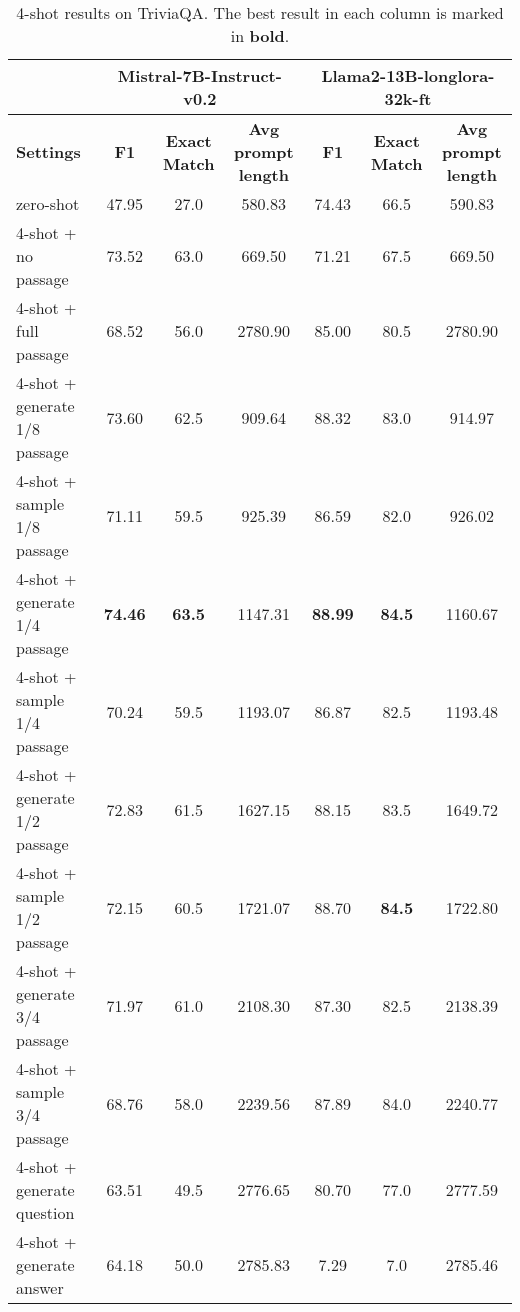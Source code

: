 \begin{table*}[tp]
\renewcommand\arraystretch{1.1}
\centering
\small
\begin{tabular}{l|ccc|ccc}
\bottomrule
\multicolumn{1}{l}{} & \multicolumn{3}{c}{\textbf{Mistral-7B-Instruct-v0.2}} & \multicolumn{3}{c}{\textbf{Llama2-13B-longlora-32k-ft}}\\
\hline
 \textbf{Settings} & \textbf{F1} & \textbf{Exact Match} & \textbf{Avg prompt length} & \textbf{F1} & \textbf{Exact Match} & \textbf{Avg prompt length}\\
\hline
zero-shot & 47.95 & 27.0 & 580.83 & 74.43 & 66.5 &590.83\\
4-shot + no passage & 73.52 & 63.0 & 669.50 & 71.21 & 67.5 & 669.50\\
4-shot + full passage & 68.52 & 56.0 & 2780.90 & 85.00 & 80.5 & 2780.90\\
\hline
4-shot + generate 1/8 passage & 73.60 & 62.5 & 909.64 & 88.32 & 83.0 & 914.97\\
4-shot + sample 1/8 passage & 71.11 & 59.5 & 925.39 & 86.59 & 82.0 & 926.02\\
4-shot + generate 1/4 passage & \textbf{74.46} & \textbf{63.5} & 1147.31 & \textbf{88.99} & \textbf{84.5} & 1160.67\\
4-shot + sample 1/4 passage & 70.24 & 59.5 & 1193.07 & 86.87 & 82.5 & 1193.48\\
4-shot + generate 1/2 passage & 72.83 & 61.5 & 1627.15 & 88.15 & 83.5 & 1649.72\\
4-shot + sample 1/2 passage & 72.15 & 60.5 & 1721.07 & 88.70 & \textbf{84.5} & 1722.80\\
4-shot + generate 3/4 passage & 71.97 & 61.0 & 2108.30 & 87.30 & 82.5 & 2138.39\\
4-shot + sample 3/4 passage & 68.76 & 58.0 & 2239.56 & 87.89& 84.0 & 2240.77\\
\hline
4-shot + generate question & 63.51 & 49.5 & 2776.65 & 80.70 & 77.0 & 2777.59\\
4-shot + generate answer & 64.18 & 50.0 & 2785.83 & 7.29 & 7.0 & 2785.46\\
\hline
\end{tabular}
\caption{4-shot results on TriviaQA. The best result in each column is marked in \textbf{bold}.}
\label{tab:tqa_main_4-shot}
\end{table*}